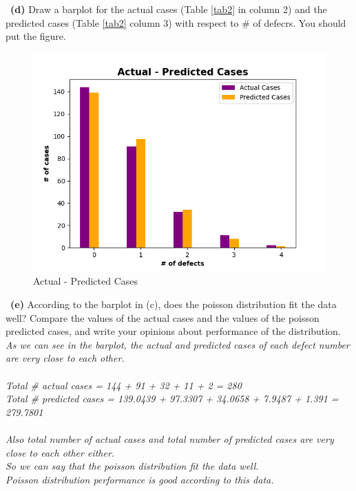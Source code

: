 \documentclass[a4 paper]{article}
\numberwithin{equation}{section}
\newcommand{\subproblem}[1]{~\newline\textbf{(#1)}}
\newcommand{\0}{\mathbf{0}}
\begin{document}
	\subproblem{d} Draw a barplot for the actual cases (Table \ref{tab2} in column 2) and the predicted cases (Table \ref{tab2} column 3) with respect to \# of defecrs. You should put the figure.\\
    \begin{figure}[h!]
      \includegraphics[scale=0.65]{barplot.png}
      \caption{Actual - Predicted Cases}
      \label{fig:barplot}
    \end{figure}
	\newpage
	\subproblem{e} According to the barplot in (c), does the poisson distribution fit the data well? Compare the values of the actual cases and the values of the poisson predicted cases, and write your opinions about performance of the distribution.\\
	{\color{purple}\phantom{x}\textit{As we can see in the barplot, the actual and predicted cases of each defect number are very close to each other.\\}}\\
	{\color{purple}\phantom{x}\hspace{6ex}\textit{Total \# actual cases = 144 + 91 + 32 + 11 + 2 = 280\\}}
	{\color{purple}\phantom{x}\hspace{6ex}\textit{Total \# predicted cases = 139.0439 + 97.3307 + 34.0658 + 7.9487 + 1.391 = 279.7801\\}}\\
	{\color{purple}\phantom{x}\textit{Also total number of actual cases and total number of predicted cases are very close to each other either.\\ So we can say that the poisson distribution fit the data well.\\ Poisson distribution performance is good according to this data.}}\\
\end{document}
